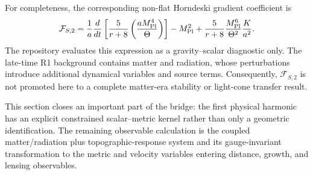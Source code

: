 For completeness, the corresponding non-flat Horndeski gradient coefficient is
\[
\mathcal F_{S,2}
=
\frac1a\frac{d}{dt}
\left[
\frac{5}{r+8}
\left(
\frac{aM_{\rm Pl}^4}{\Theta}
\right)
\right]
-M_{\rm Pl}^2
+
\frac{5}{r+8}
\frac{M_{\rm Pl}^6}{\Theta^2}
\frac{K}{a^2}.
\]
The repository evaluates this expression as a gravity--scalar diagnostic only. The late-time R1 background contains matter and radiation, whose perturbations introduce additional dynamical variables and source terms. Consequently, \(\mathcal F_{S,2}\) is not promoted here to a complete matter-era stability or light-cone transfer result.

This section closes an important part of the bridge: the first physical harmonic has an explicit constrained scalar--metric kernel rather than only a geometric identification. The remaining observable calculation is the coupled matter/radiation plus topographic-response system and its gauge-invariant transformation to the metric and velocity variables entering distance, growth, and lensing observables.
